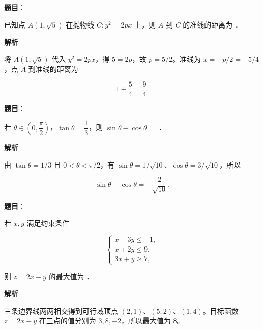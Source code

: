 \begin{answer}

\textbf{题目}：

已知点 $A(1,\sqrt5)$ 在抛物线 $C:y^2=2px$ 上，则 $A$ 到 $C$ 的准线的距离为 \gkblank{}．

\textbf{解析}

将 $A(1,\sqrt5)$ 代入 $y^2=2px$，得 $5=2p$，故 $p=5/2$。准线为 $x=-p/2=-5/4$，点 $A$ 到准线的距离为

\nopagebreak[4]
\[
1+\frac54=\frac94.
\]


\end{answer}
\begin{answer}

\textbf{题目}：

若 $\theta\in\left(0,\dfrac\pi2\right)$，$\tan\theta=\dfrac13$，则 $\sin\theta-\cos\theta=$ \gkblank{}．

\textbf{解析}

由 $\tan\theta=1/3$ 且 $0<\theta<\pi/2$，有 $\sin\theta=1/\sqrt{10}$、$\cos\theta=3/\sqrt{10}$，所以

\nopagebreak[4]
\[
\sin\theta-\cos\theta=-\frac2{\sqrt{10}}.
\]


\end{answer}
\begin{answer}

\textbf{题目}：

若 $x,y$ 满足约束条件

\nopagebreak[4]
\[
\begin{cases}
x-3y\leqslant-1,\\
x+2y\leqslant9,\\
3x+y\geqslant7,
\end{cases}
\]

则 $z=2x-y$ 的最大值为 \gkblank{}．

\textbf{解析}

三条边界线两两相交得到可行域顶点 $(2,1)$、$(5,2)$、$(1,4)$。目标函数 $z=2x-y$ 在三点的值分别为 $3,8,-2$，所以最大值为 $8$。


\end{answer}
